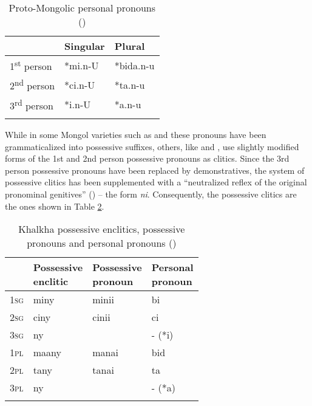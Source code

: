 \documentclass[output=paper,colorlinks,citecolor=brown]{langscibook}
\begin{document}
\begin{table}
\begin{tabular}{ l l l }
  \lsptoprule
& Singular &	Plural\\
  \midrule
1\textsuperscript{st} person &	*mi.n-U &	*bida.n-u\\
2\textsuperscript{nd} person &	*ci.n-U &	*ta.n-u\\
3\textsuperscript{rd} person &	*i.n-U &	*a.n-u\\
  \lspbottomrule
\end{tabular}
\caption{Proto-Mongolic personal pronouns (\citealt[18]{Janhunen2003a})}
\label{table:9.1}
\end{table}

While in some Mongol varieties such as  and  these pronouns have been grammaticalized into possessive suffixes, others, like  and , use slightly modified forms of the 1st and 2nd person possessive pronouns as clitics. Since the 3rd person possessive pronouns have been replaced by demonstratives, the system of possessive clitics has been supplemented with a “neutralized reflex of the original pronominal genitives” (\citealt[92]{Janhunen2003b}) – the form \textit{ni}. Consequently, the  possessive clitics are the ones shown in Table \ref{table:9.2}.


\begin{table}
\begin{tabular}{ l l l l }
  \lsptoprule
& \thead{Possessive\\ enclitic} &	\thead{Possessive\\ pronoun} &	\thead{Personal\\ pronoun}\\
  \midrule
1\textsc{sg} &	miny &	minii &	bi\\
2\textsc{sg} &	ciny &	cinii &	ci\\
3\textsc{sg} &	ny & &		-  (*i)\\
1\textsc{pl} &	maany &	manai &	bid\\
2\textsc{pl} &	tany &	tanai &	ta\\
3\textsc{pl} &	ny & &		-  (*a)\\
  \lspbottomrule
\end{tabular}
\caption{Khalkha possessive enclitics, possessive pronouns and personal pronouns (\citealt[164]{Svantesson2003})}
\label{table:9.2}
\end{table}
\end{document}
